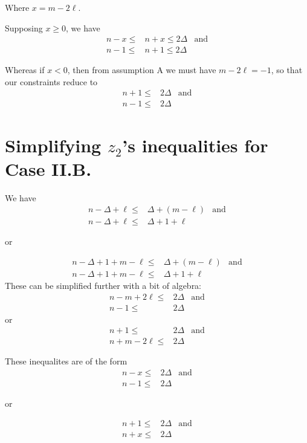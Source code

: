 \documentclass[letterpaper, 10pt]{article}
\begin{document}
Where $x = m -2\ell$.

Supposing $x\geq 0$, we have
\begin{align*}
 n-x \leq & n+x \leq 2 \Delta & \text{and} \\
 n-1 \leq & n+1 \leq 2\Delta
\end{align*}

Whereas if $x <0$, then from assumption A we must have $m-2\ell = -1$, so that
our constraints reduce to
\begin{align*}
 n+1 \leq & 2 \Delta & \text{and} \\
 n-1 \leq & 2 \Delta
\end{align*}

\newpage
\section{Simplifying $z_2$'s inequalities for Case II.B.}

We have
\begin{align*}
 n - \Delta + \ell \leq & \Delta + (m - \ell) & \text{and} \\
 n - \Delta + \ell \leq & \Delta + 1 + \ell
\end{align*}
\begin{center}or\end{center}
\begin{align*}
 n - \Delta + 1 + m - \ell \leq & \Delta + (m - \ell) & \text{and} \\
 n - \Delta + 1 + m - \ell \leq & \Delta + 1 + \ell
\end{align*}
These can be simplified further with a bit of algebra:
\begin{align*}
 n-m+2\ell \leq & 2 \Delta & \text{and} \\
 n-1 \leq       & 2\Delta
\end{align*}
or
\begin{align*}
 n+1 \leq        & 2 \Delta & \text{and} \\
 n+m-2\ell  \leq & 2 \Delta
\end{align*}

These inequalites are of the form
\begin{align*}
 n-x \leq & 2 \Delta & \text{and} \\
 n-1 \leq & 2\Delta
\end{align*}
\begin{center}or\end{center}
\begin{align*}
 n + 1 \leq & 2 \Delta & \text{and} \\
 n + x \leq & 2 \Delta
\end{align*}
\end{document}
